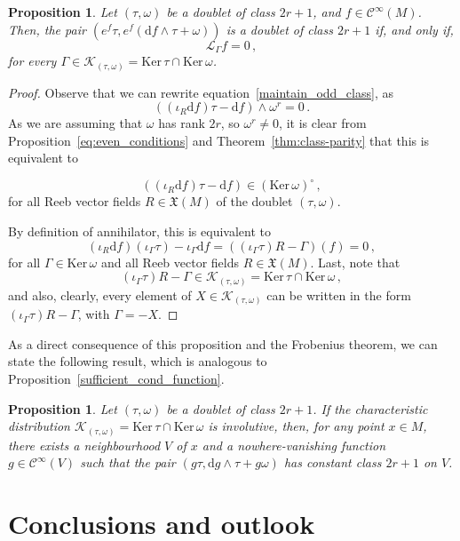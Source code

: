 \documentclass[11pt,twoside]{article}
\theoremstyle{plain}
\newtheorem{proposition}[theorem]{Proposition}
\theoremstyle{definition}
\renewcommand{\d}{\mathrm{d}}
\newcommand{\Cinfty}{\mathscr{C}^\infty}
\newcommand*{\inn}[1]{\iota_{#1}}
\newcommand{\Lie}{\mathscr{L}}
\newcommand{\X}{\mathfrak{X}}
\def\d{\mathrm{d}}
\def\X{\mathfrak{X}}
\def\d{\mathrm{d}}
\def\Ker{\mathrm{Ker \,}}
\def\Lie{\mathscr{L}}
\def\K{\mathcal{K}}
\begin{document}
\begin{proposition}\label{odd_class_stay}
        Let $(\tau,\omega)$ be a doublet of class $2r+1$, and $f\in\Cinfty(M)$. Then, the pair $(e^f\tau, e^f(\d f\wedge \tau+\omega))$ is a doublet of class $2r+1$ if, and only if, 
    $$\Lie_{\Gamma} f = 0\,,$$
for every $\Gamma \in \K_{(\tau , \omega)} = \Ker \tau \cap \Ker \omega$.
\end{proposition}
\begin{proof}
    Observe that we can rewrite equation~\eqref{maintain_odd_class}, as
$$((\inn{R}\d f) \tau -\d f)\wedge \omega ^r = 0\,.$$
As we are assuming that $\omega$ has rank $2r$, so $\omega^r \neq 0$, it is clear from Proposition~\ref{eq:even_conditions} and Theorem~\ref{thm:class-parity} that this is equivalent to

$$ 
((\inn{R} \d f)\tau - \d f ) \in (\Ker \omega )^{\circ}\,,
$$
for all Reeb vector fields $R \in \X(M)$ of the doublet $(\tau ,\omega)$.

 By definition of annihilator, this is equivalent to
$$(\inn{R} \d f)(\inn{\Gamma}\tau) - \inn{\Gamma} \d f= ((\inn{\Gamma} \tau)R-\Gamma)(f) = 0\,,$$
for all $\Gamma \in \Ker \omega$ and all Reeb vector fields $R \in \X(M)$. Last, note that 
$$(\inn{\Gamma} \tau ) R - \Gamma \in \K_{(\tau , \omega)} = \Ker \tau \cap \Ker \omega\,,$$
and also, clearly, every element of $X \in \K_{(\tau , \omega)}$ can be written in the form $(\inn{\Gamma}\tau) R -\Gamma$, with $\Gamma = -X$.
\end{proof}

As a direct consequence of this proposition and the Frobenius theorem,
we can state the following result,
which is analogous to Proposition~\ref{sufficient_cond_function}.
\begin{proposition}
Let $(\tau,\omega)$ be a doublet of class $2r+1$. 
If the characteristic distribution 
$\K _{(\tau,\omega)} = \Ker \tau \cap \Ker \omega$ 
is involutive, then, for any point $x\in M$, 
there exists a neighbourhood $V$ of $x$ and 
a nowhere-vanishing function $g\in \Cinfty(V)$ 
such that the pair $(g\tau,\d g\wedge \tau + g\omega)$ 
has constant class $2r+1$ on $V$.
\end{proposition}



\section*{Conclusions and outlook}
\end{document}

